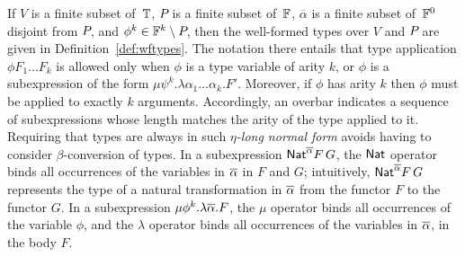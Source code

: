 \documentclass[runningheads]{llncs}
\begin{document}
If $V$ is a finite subset of\, $\mathbb{T}$, $P\!$ is a finite subset
of\, $\mathbb{F}$, $\overline{\alpha}$ is a finite subset of\, $\mathbb{F}^0$
disjoint from $P\!$, and $\phi^k \in \mathbb{F}^k \setminus P\!$, then
the well-formed types over $V$ and $P\!$ are given in
Definition~\ref{def:wftypes}.  The notation there entails that type
application $\phi F_1...F_k$ is allowed only when $\phi$ is a type
variable of arity $k$, or $\phi$ is a subexpression of the form $\mu
\psi^{k}.\lambda \alpha_1...\alpha_k.F'$. Moreover, if $\phi$ has
arity $k$ then $\phi$ must be applied to exactly $k$ arguments.
Accordingly, an overbar indicates a sequence of subexpressions whose
length matches the arity of the type applied to it. Requiring that
types are always in such \emph{$\eta$-long normal form} avoids having
to consider $\beta$-conversion of types. In a subexpression
$\mathsf{Nat}^{\overline{\alpha}}F\,G$, the $\mathsf{Nat}$ operator binds all occurrences of
the variables in $\overline{\alpha}$ in $F$ and $G$; intuitively, $\mathsf{Nat}^{\overline{\alpha}}F\,G$ represents the type of a natural transformation in $\overline{\alpha}$ from the functor $F$ to the functor $G$. In a subexpression
$\mu \phi^k.\lambda \overline{\alpha}.F$, the $\mu$ operator binds all
occurrences of the variable $\phi$, and the $\lambda$ operator binds
all occurrences of the variables in $\overline{\alpha}$, in the body $F$.
\end{document}
